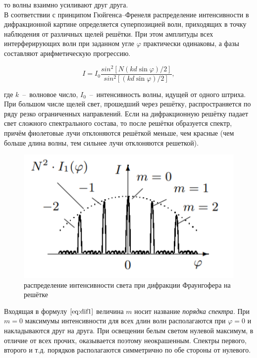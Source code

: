 \documentclass[a4paper,12pt]{article}
\begin{document}
\noindent то волны взаимно усиливают друг друга.\\

В соответствии с принципом Гюйгенса–Френеля распределение интенсивности в дифракционной картине определяется суперпозицией волн, приходящих в точку наблюдения от различных щелей решётки. При этом амплитуды всех интерферирующих волн при заданном угле $\varphi$ практически одинаковы, а фазы составляют арифметическую прогрессию.

\begin{equation}
	I = I_0 \dfrac{sin^2[N(kd \sin{\varphi})/2]}{sin^2[(kd \sin{\varphi})/2]},
	\label{eq:dif3}
\end{equation}

\noindent где $k$~--~волновое число, $I_0$~--~интенсивность волны, идущей от одного штриха. \\

При большом числе щелей свет, прошедший через решётку, распространяется по ряду резко ограниченных направлений. Если на дифракционную решётку падает свет сложного спектрального состава, то после решётки образуется спектр, причём фиолетовые лучи отклоняются решёткой меньше, чем красные (чем больше длина волны, тем сильнее лучи отклоняются решеткой).

\begin{figure}
	\includegraphics[scale = 0.7]{img2}
	\caption{распределение интенсивности света при дифракции Фраунгофера на решётке}
\end{figure}

\noindent Входящая в формулу $\eqref{eq:dif1}$ величина $m$ носит название \textit{порядка спектра}. При $m = 0$ максимумы интенсивности для всех длин волн располагаются при $\varphi = 0$ и накладываются друг на друга. При освещении белым светом нулевой максимум, в отличие от всех прочих, оказывается поэтому неокрашенным. Спектры первого, второго и т.д. порядков располагаются симметрично по обе стороны от нулевого.
\end{document}
